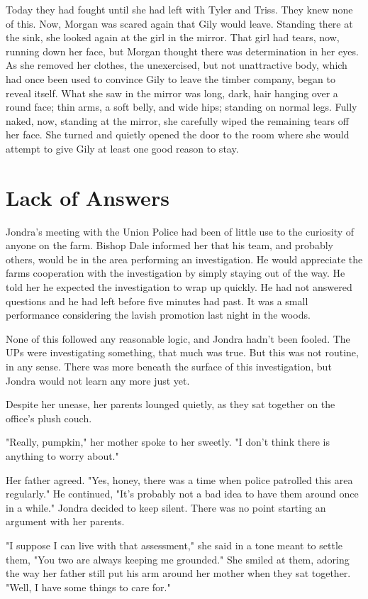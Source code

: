 \documentclass[courier]{sffms}
\begin{document}
Today they had fought until she had left with Tyler
and Triss. They knew none of this. Now, Morgan was
scared again that Gily would leave. Standing there
at the sink, she looked again at the girl in the mirror.
That girl had tears, now, running down her face, but
Morgan thought there was determination in her eyes.
As she removed her clothes, the unexercised, but
not unattractive body, 
which had once been used to convince
Gily to leave the timber company, began to reveal
itself. What she saw in the mirror
was long, dark, hair hanging over a round
face; thin arms, a soft belly, and wide hips;
standing on normal legs.
Fully naked, now, standing at the mirror, she carefully
wiped the remaining tears off her face. She turned and
quietly opened the door to the room where she would
attempt to give Gily at least one good reason to stay.

\chapter{Lack of Answers}
Jondra's meeting with the Union Police had been of little
use to the curiosity of anyone on the farm.
Bishop Dale informed her that his team,
and probably others, would be in the area performing
an investigation. He would appreciate the farms
cooperation with the investigation by simply staying
out of the way. He told her he expected the investigation
to wrap up quickly. He had not answered questions
and he had left before five minutes had past.
It was a small performance considering the
lavish promotion last night in the woods.

None of this followed any reasonable logic, and Jondra
hadn't been fooled. The UPs were investigating
something, that much was true. But this was not
routine, in any sense. There was more beneath the
surface of this investigation, but Jondra would not
learn any more just yet.

Despite her unease, her parents lounged quietly,
as they sat together on the office's plush couch.

"Really, pumpkin," her mother spoke to her sweetly.
"I don't think there is anything to worry about."

Her father agreed. "Yes, honey, there was a time
when police patrolled this area regularly."
He continued, "It's probably not a bad idea
to have them around once in a while." Jondra
decided to keep silent. There was no point
starting an argument with her parents.

"I suppose I can live with that assessment," she
said in a tone meant to settle them, "You two
are always keeping me grounded." She smiled
at them, adoring the way her father still
put his arm around her mother when they sat
together. "Well, I have some things to care for."
\end{document}
